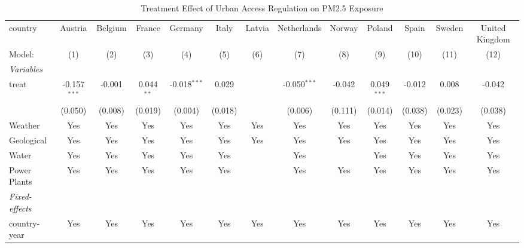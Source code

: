 
\begin{table}[htbp]
   \caption{\label{tab:did_country} Treatment Effect of Urban Access Regulation on PM2.5 Exposure}
   \centering
   \small
   \begin{tabular}{lcccccccccccc}
      \tabularnewline \midrule \midrule
      country                         & Austria        & Belgium & France       & Germany        & Italy   & Latvia                  & Netherlands    & Norway  & Poland        & Spain   & Sweden  & United Kingdom \\   
      Model:                          & (1)            & (2)     & (3)          & (4)            & (5)     & (6)                     & (7)            & (8)     & (9)           & (10)    & (11)    & (12)\\  
      \midrule
      \emph{Variables}\\
      treat                           & -0.157$^{***}$ & -0.001  & 0.044$^{**}$ & -0.018$^{***}$ & 0.029   &                         & -0.050$^{***}$ & -0.042  & 0.049$^{***}$ & -0.012  & 0.008   & -0.042\\   
                                      & (0.050)        & (0.008) & (0.019)      & (0.004)        & (0.018) &                         & (0.006)        & (0.111) & (0.014)       & (0.038) & (0.023) & (0.038)\\   
      Weather                         & Yes            & Yes     & Yes          & Yes            & Yes     & Yes                     & Yes            & Yes     & Yes           & Yes     & Yes     & Yes\\  
      Geological                      & Yes            & Yes     & Yes          & Yes            & Yes     & Yes                     & Yes            & Yes     & Yes           & Yes     & Yes     & Yes\\  
      Water                           & Yes            & Yes     & Yes          & Yes            & Yes     &                         & Yes            &         & Yes           & Yes     & Yes     & Yes\\  
      Power Plants                    & Yes            & Yes     & Yes          & Yes            & Yes     &                         & Yes            & Yes     & Yes           & Yes     & Yes     & Yes\\  
      \midrule
      \emph{Fixed-effects}\\
      country-year                    & Yes            & Yes     & Yes          & Yes            & Yes     & Yes                     & Yes            & Yes     & Yes           & Yes     & Yes     & Yes\\  

\end{tabular}
\end{table}
